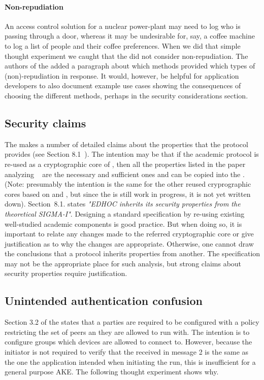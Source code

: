 \documentclass[runningheads,draft,x11names]{llncs}
\begin{document}
\paragraph{Non-repudiation}
An access control solution for a nuclear power-plant may need to log who is
passing through a door, whereas it may be undesirable for, say, a coffee machine
to log a list of people and their coffee preferences.
%
When we did that simple thought experiment we caught that the \mSpec{} did not
consider non-repudiation.
%
The authors of the \mSpec{} added a paragraph about which methods provided which
types of (non)-repudiation in response.
%
It would, however, be helpful for application developers to also document
example use cases showing the consequences of choosing the different methods,
perhaps in the security considerations section.

\subsection{Security claims}
\label{sec:securityClaims}
The \mSpec{} makes a number of detailed claims about the properties that
the protocol provides (see Section 8.1~\cite{selander-lake-edhoc-01}).
%
The intention may be that if the academic protocol \mSigma{} is re-used as a
cryptographic core of \mEdhoc, then all the properties listed
in the paper analyzing \mSigma~\cite{DBLP:conf/crypto/CanettiK02} are the
necessary and sufficient ones and can be copied into the \mSpec.
%
(Note: presumably the intention is the same for the other reused cryprographic
cores based on \mOptls{} and \mNoise{}, but since the \mSpec{} is still work in
progress, it is not yet written down).
%
Section~8.1. states \emph{"EDHOC inherits its security properties
from the theoretical SIGMA-I"}.
%
Designing a standard specification by re-using existing well-studied academic
components is good practice.
%
But when doing so, it is important to relate any changes made to the referred
cryptographic core or give justification as to why the changes are appropriate.
%
Otherwise, one cannot draw the conclusions that a protocol inherits properties
from another.
%
The specification may not be the appropriate place for such analysis, but strong
claims about security properties require justification.
%

\subsection{Unintended authentication confusion}
\label{sec:usableSecurity}
Section 3.2 of the \mSpec{} states that a parties are required to be configured
with a policy restricting the set of peers an they are allowed to run \mEdhoc{}
with.
%
The intention is to configure groups which devices are allowed to connect to.
%
However, because the initiator is not required to verify that the \mIdcredr{}
received in message 2 is the same as the one the application intended when
initiating the \mEdhoc{} run, this is insufficient for a general purpose AKE.
%
The following thought experiment shows why.
\end{document}
